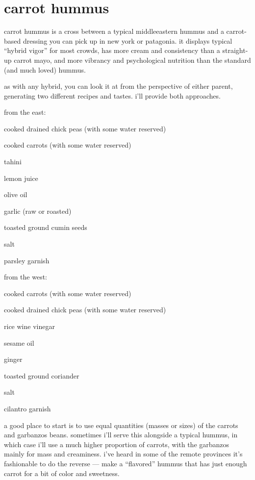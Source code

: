 \section{carrot hummus}

carrot hummus is a cross between a typical middleeastern hummus and a
carrot-based dressing you can pick up in new york or patagonia. it
displays typical ``hybrid vigor'' for most crowds, has more cream and
consistency than a straight-up carrot mayo, and more vibrancy and
psychological nutrition than the standard (and much loved) hummus.

as with any hybrid, you can look it at from the perspective of either
parent, generating two different recipes and tastes. i'll provide both
approaches.

from the east:

\begin{ingredients}
  \item cooked drained chick peas (with some water reserved)
  \item cooked carrots (with some water reserved)
  \item tahini
  \item lemon juice
  \item olive oil
  \item garlic (raw or roasted)
  \item toasted ground cumin seeds
  \item salt
  \item parsley garnish
\end{ingredients}

from the west:

\begin{ingredients}
  \item cooked carrots (with some water reserved)
  \item cooked drained chick peas (with some water reserved)
  \item rice wine vinegar
  \item sesame oil
  \item ginger
  \item toasted ground coriander
  \item salt
  \item cilantro garnish
\end{ingredients}

a good place to start is to use equal quantities (masses or sizes) of
the carrots and garbanzos beans. sometimes i'll serve this alongside a
typical hummus, in which case i'll use a much higher proportion of
carrots, with the garbanzos mainly for mass and creaminess. i've heard
in some of the remote provinces it's fashionable to do the reverse ---
make a ``flavored'' hummus that has just enough carrot for a bit of
color and sweetness.

